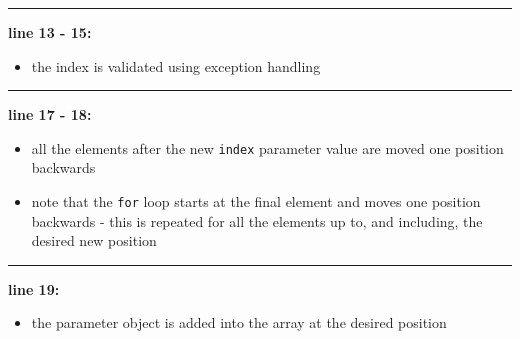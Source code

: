 \vspace{0.1cm}
\noindent
\textcolor{RedOrange}{\rule{\textwidth}{0.5pt}}
\vspace{-0.1cm}

\noindent
\begin{minipage}{0.15\textwidth}
    \textcolor{RedOrange}{\textbf{line 13 - 15:}}
\end{minipage}
\begin{minipage}{0.85\textwidth}
    \begin{itemize}
        \item[] the index is validated using exception handling
    \end{itemize}
\end{minipage}

\vspace{0.1cm}
\noindent
\textcolor{RedOrange}{\rule{\textwidth}{0.5pt}}
\vspace{-0.1cm}

\noindent
\begin{minipage}[c]{0.15\textwidth}
    \textcolor{RedOrange}{\textbf{line 17 - 18:}}
\end{minipage}
\begin{minipage}[c]{0.85\textwidth}
    \begin{itemize}
        \item[] all the elements after the new \texttt{index} parameter value are moved one position backwards 
        \item[] note that the \texttt{for} loop starts at the final element and moves one position backwards - this is repeated for all the elements up to, and including, the desired new position
    \end{itemize}
\end{minipage}

\vspace{0.2cm}
\noindent
\textcolor{RedOrange}{\rule{\textwidth}{0.5pt}}
\vspace{-0.1cm}

\noindent
\begin{minipage}{0.15\textwidth}%
    \textcolor{RedOrange}{\textbf{line 19:}}
\end{minipage}
\begin{minipage}{0.85\textwidth}
    \begin{itemize}
        \item[] the parameter object is added into the array at the desired position
    \end{itemize}
\end{minipage}


